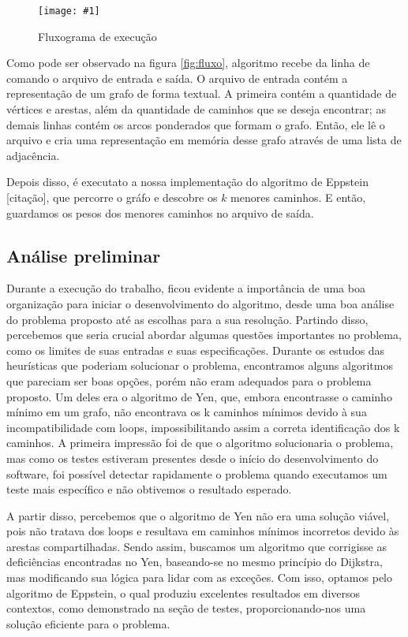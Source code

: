 \documentclass[12pt]{article}
\newcommand\image[2]{\noindent \begin{figure}[h]
    \texttt{[image: \#1]}
    \label{fig: #1}
    \caption{#2}
    \end{figure}
    }
\begin{document}
    \image{fluxo}{Fluxograma de execução}

    Como pode ser observado na figura \ref{fig:fluxo}, algoritmo recebe da linha de
    comando o arquivo de entrada e saída. O arquivo de entrada contém a
    representação de um grafo de forma textual. A primeira contém a quantidade
    de vértices e arestas, além da quantidade de caminhos que se deseja
    encontrar; as demais linhas contém os arcos ponderados que formam o grafo.
    Então, ele lê o arquivo e cria uma representação em memória desse grafo
    através de uma lista de adjacência.

    Depois disso, é executato a nossa implementação do algoritmo de Eppstein
    [citação], que percorre o gráfo e descobre os $k$ menores caminhos. E então,
    guardamos os pesos dos menores caminhos no arquivo de saída.

    \subsection{Análise preliminar}

    Durante a execução do trabalho, ficou evidente a importância de uma boa organização para iniciar o desenvolvimento do algoritmo, desde uma boa análise do problema proposto até as escolhas para a sua resolução. Partindo disso, percebemos que seria crucial abordar algumas questões importantes no problema, como os limites de suas entradas e suas especificações. Durante os estudos das heurísticas que poderiam solucionar o problema, encontramos alguns algoritmos que pareciam ser boas opções, porém não eram adequados para o problema proposto. Um deles era o algoritmo de Yen, que, embora encontrasse o caminho mínimo em um grafo, não encontrava os k caminhos mínimos devido à sua incompatibilidade com loops, impossibilitando assim a correta identificação dos k caminhos. A primeira impressão foi de que o algoritmo solucionaria o problema, mas como os testes estiveram presentes desde o início do desenvolvimento do software, foi possível detectar rapidamente o problema quando executamos um teste mais específico e não obtivemos o resultado esperado. 
    
    A partir disso, percebemos que o algoritmo de Yen não era uma solução viável, pois não tratava dos loops e resultava em caminhos mínimos incorretos devido às arestas compartilhadas. Sendo assim, buscamos um algoritmo que corrigisse as deficiências encontradas no Yen, baseando-se no mesmo princípio do Dijkstra, mas modificando sua lógica para lidar com as exceções. Com isso, optamos pelo algoritmo de Eppstein, o qual produziu excelentes resultados em diversos contextos, como demonstrado na seção de testes, proporcionando-nos uma solução eficiente para o problema.
\end{document}
